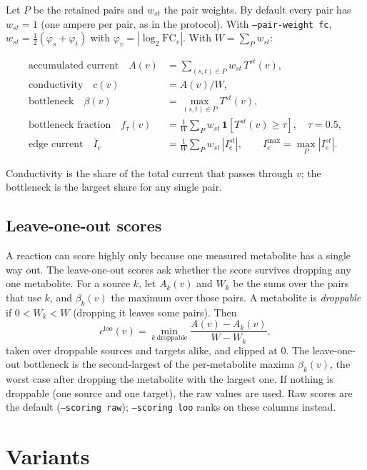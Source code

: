 \documentclass[11pt]{article}
\newcommand{\code}[1]{\texttt{#1}}
\begin{document}
Let $P$ be the retained pairs and $w_{st}$ the pair weights. By default every pair
has $w_{st}=1$ (one ampere per pair, as in the protocol). With
\code{--pair-weight fc}, $w_{st} = \tfrac12(\varphi_s+\varphi_t)$ with
$\varphi_v = |\log_2\mathrm{FC}_v|$. With $W=\sum_{P} w_{st}$:

\begin{align}
  \text{accumulated current}\quad A(v) &= \textstyle\sum_{(s,t)\in P} w_{st}\,T^{st}(v),\\
  \text{conductivity}\quad c(v) &= A(v)/W,\\
  \text{bottleneck}\quad \beta(v) &= \max_{(s,t)\in P} T^{st}(v),\\
  \text{bottleneck fraction}\quad f_\tau(v) &= \tfrac{1}{W}\textstyle\sum_{P} w_{st}\,\mathbf 1\!\left[T^{st}(v)\ge\tau\right],\quad \tau=0.5,\\
  \text{edge current}\quad \bar I_e &= \tfrac1W\textstyle\sum_P w_{st}\,|I^{st}_e|,\qquad I^{\max}_e = \max_P |I^{st}_e| .
\end{align}

Conductivity is the share of the total current that passes through $v$; the
bottleneck is the largest share for any single pair.

\subsection{Leave-one-out scores}
A reaction can score highly only because one measured metabolite has a single way
out. The leave-one-out scores ask whether the score survives dropping any one
metabolite. For a source $k$, let $A_k(v)$ and $W_k$ be the sums over the pairs that
use $k$, and $\beta_k(v)$ the maximum over those pairs. A metabolite is
\emph{droppable} if $0 < W_k < W$ (dropping it leaves some pairs). Then
\[
  c^{\mathrm{loo}}(v) = \min_{k\ \mathrm{droppable}} \frac{A(v)-A_k(v)}{W-W_k},
\]
taken over droppable sources and targets alike, and clipped at $0$. The leave-one-out
bottleneck is the second-largest of the per-metabolite maxima $\beta_k(v)$, the worst
case after dropping the metabolite with the largest one. If nothing is droppable (one
source and one target), the raw values are used. Raw scores are the default
(\code{--scoring raw}); \code{--scoring loo} ranks on these columns instead.

\section{Variants}
\end{document}
